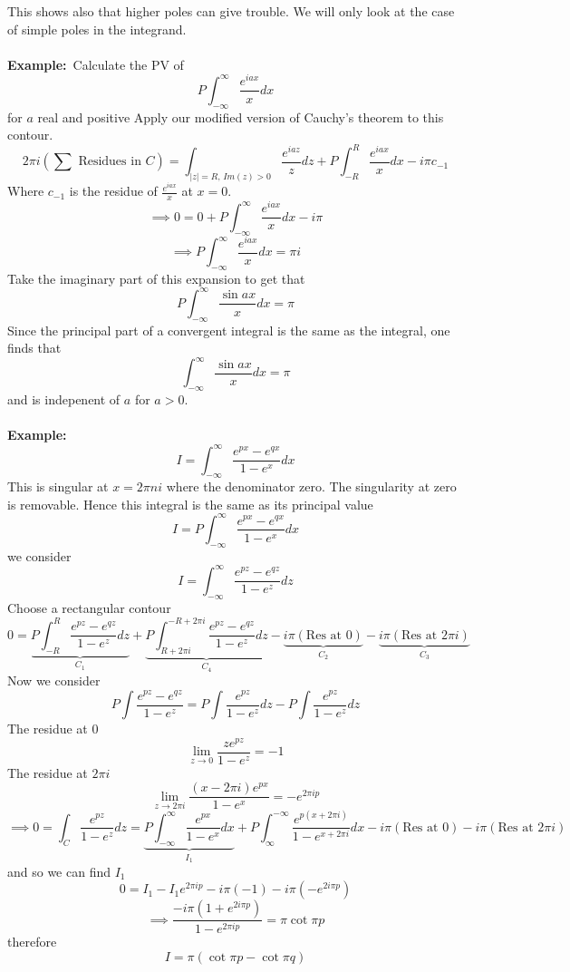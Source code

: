\documentclass{article}
\newcommand{\example}{\textbf{Example:}}
\newcommand{\improp}{\int_{-\infty}^{\infty} } %
\begin{document}
This shows also that higher poles can give trouble. We will only look at the case
of simple poles in the integrand.
\\
\\
\example\ Calculate the PV of 
\[ P \int_{-\infty}^{\infty} \frac{e^{iax}}{x} dx \]
for $a$ real and positive
Apply our modified version of Cauchy's theorem to this contour.
\[ 2\pi i \left( \sum \mbox{ Residues in } C \right)  = 
\int_{|z| = R, \, Im(z) >0} \frac{e^{iaz}}{z}dz +
P \int_{-R}^{R} \frac{e^{iax}}{x} dx - i\pi c_{-1} \]
Where $c_{-1}$ is the residue of $\frac{e^{iax}}{x}$ at $x=0$.
\[ \implies 0 = 0 + P\int_{-\infty}^{\infty} \frac{e^{iax}}{x} dx - i \pi \]
\[ \implies P\int_{-\infty}^{\infty} \frac{e^{iax}}{x} dx = \pi i \]
Take the imaginary part of this expansion to get that
\[ P \int_{-\infty}^{\infty} \frac{\sin ax}{x} dx = \pi\]
Since the principal part of a convergent integral is the same
as the integral, one finds that
\[ \int_{-\infty}^{\infty} \frac{\sin ax}{x} dx = \pi \] and is indepenent
of $a$ for $a>0$.
\\
\\
\example\
\begin{equation}
I = \improp \frac{e^{px} - e^{qx}}{1 - e^x} dx \tag{$0 < p,q < 1$}
\end{equation}
This is singular at $x = 2 \pi n i$ where the denominator zero. The
singularity at zero is removable. Hence this integral is the same as its
principal value 
\[I = P\improp \frac{e^{px} - e^{qx}}{1 - e^x} dx  \]
we consider 
\[I = \improp \frac{e^{pz} - e^{qz}}{1 - e^z} dz  \]
Choose a rectangular contour
\[ 0 = \underbrace{P\int^{R}_{-R} \frac{e^{pz} - e^{qz}}{1 - e^z} dz}_{C_1}
+ \underbrace{P \int^{-R+2\pi i}_{R+2\pi i} \frac{e^{pz} - e^{qz}}{1 - e^z} dz }_{C_4}
-\underbrace{i\pi \left( \mbox{Res at } 0 \right)}_{C_2}
-\underbrace{i\pi \left( \mbox{Res at } 2\pi i \right)}_{C_3} \]
Now we consider
\[ P \int \frac{e^{pz} - e^{qz}}{1-e^z} = P\int \frac{e^{pz}}{1-e^z} dz - 
P \int \frac{e^{pz}}{1-e^z} dz \]
The residue at 0
\[ \lim_{z \to 0} \frac{z e^{pz}}{1- e^z} = -1 \]
The residue at $2\pi i$
\[ \lim_{z \to 2 \pi i} \frac{(x - 2 \pi i)e^{px}}{1- e^x} = -e^{2 \pi i p} \]
\[\implies  0 = 
\int_C \frac{e^{pz}}{1-e^z} dz =
\underbrace{P\improp \frac{e^{px}}{1 - e^x} dx}_{I_1}
+ P \int^{-\infty}_{\infty} \frac{e^{p(x+2\pi i)}}{1 - e^{x+2\pi i}} dx 
-i\pi \left( \mbox{Res at } 0 \right)
-i\pi \left( \mbox{Res at } 2\pi i \right) \]
and so we can find $I_1$
\[ 0 = I_1 - I_1 e^{2\pi i p} - i\pi(-1) - i \pi ( -e^{2i\pi p}) \]
\[ \implies \frac{-i\pi (1+e^{2i\pi p})}{1 - e^{2\pi i p} }  =
\pi \cot \pi p\]
therefore
\[ I = \pi (\cot \pi p - \cot \pi q) \]
%
% 
\end{document}
